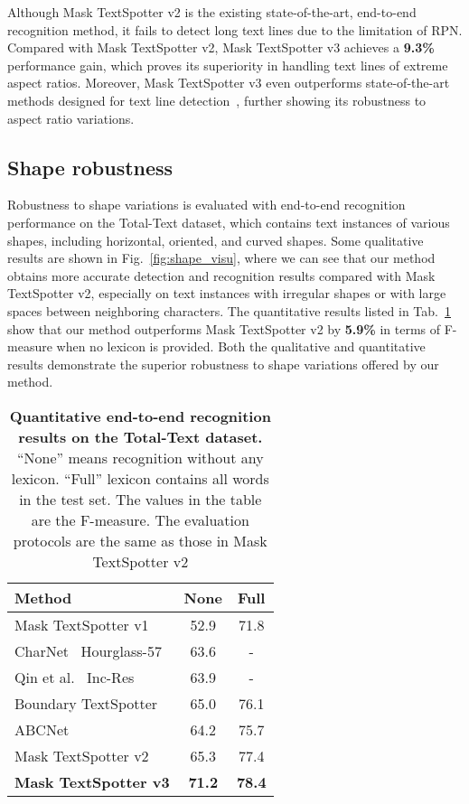 \documentclass[runningheads]{llncs}
\begin{document}
Although Mask TextSpotter v2 is the existing state-of-the-art, end-to-end recognition method, it fails to detect long text lines due to the limitation of RPN. Compared with Mask TextSpotter v2, Mask TextSpotter v3 achieves a \textbf{9.3\%} performance gain, which proves its superiority in handling text lines of extreme aspect ratios. Moreover, Mask TextSpotter v3 even outperforms state-of-the-art methods designed for text line detection~\cite{mcn,craft,tian2019learning}, further showing its robustness to aspect ratio variations.

\subsection{Shape robustness}
Robustness to shape variations is evaluated with end-to-end recognition performance on the Total-Text dataset, which contains text instances of various shapes, including horizontal, oriented, and curved shapes. Some qualitative results are shown in Fig.~\ref{fig:shape_visu}, where we can see that our method obtains more accurate detection and recognition results compared with Mask TextSpotter v2, especially on text instances with irregular shapes or with large spaces between neighboring characters. The quantitative results listed in Tab.~\ref{tab:total-text} show that our method outperforms Mask TextSpotter v2 by \textbf{5.9\%} in terms of F-measure when no lexicon is provided. Both the qualitative and quantitative results demonstrate the superior robustness to shape variations offered by our method.

\begin{table}[ht]
    \setlength{\tabcolsep}{13.0pt}
    \centering
    \caption{\textbf{Quantitative end-to-end recognition results on the Total-Text dataset.} ``None'' means recognition without any lexicon. ``Full'' lexicon contains all words in the test set. The values in the table are the F-measure. The evaluation protocols are the same as those in Mask TextSpotter v2
    }
    \begin{tabularx}{0.65\linewidth}{lcc}
    \toprule
    Method    & None               & Full       \\ 
    \midrule
    Mask TextSpotter v1~\cite{LyuLYWB18}          & 52.9               & 71.8               \\ 
    CharNet~\cite{xing2019charnet} Hourglass-57               & 63.6               & -                  \\ 
    Qin et al.~\cite{qin2019towards} Inc-Res           & 63.9               & -                  \\ 
    Boundary TextSpotter~\cite{WangLZYBXHW020}          & 65.0               & 76.1                  \\ 
    ABCNet~\cite{abcnet}          & 64.2               & 75.7                  \\ 
    Mask TextSpotter v2~\cite{liao2019mask}          & 65.3               & 77.4               \\ 
    \hline
    \textbf{Mask TextSpotter v3} & \textbf{71.2}      & \textbf{78.4}      \\
    \bottomrule 
    \end{tabularx}
    \label{tab:total-text}
\end{table}
\end{document}
